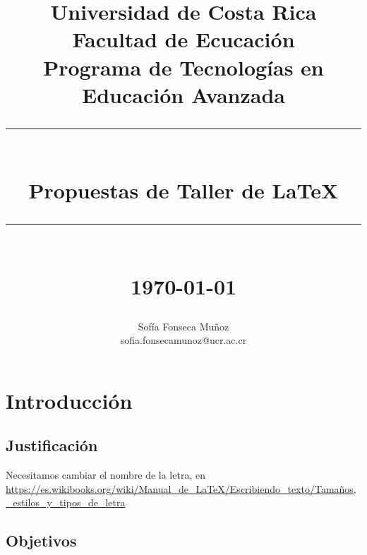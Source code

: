 \documentclass[12pt]{report}
\newcommand{\HRule}[1]{\rule{\linewidth}{#1}}
\begin{document}
\title{ \normalsize Universidad de Costa Rica \\
		Facultad de Ecucación\\
		Programa de Tecnologías en Educación Avanzada
		\\ [2.0cm]
		\HRule{0.5pt} \\
		\LARGE \textbf{Propuestas de Taller de \LaTeX} %
		\HRule{2pt} \\ [0.5cm]
		\normalsize \today \vspace*{5\baselineskip}}

\date{}

\author{
		Sofía Fonseca Muñoz \\ 
		 sofia.fonsecamunoz@ucr.ac.cr}
\maketitle

\tableofcontents
\newpage



\chapter{Introducción}

\section{Justificación}
Necesitamos cambiar el nombre de la letra, en \url{https://es.wikibooks.org/wiki/Manual_de_LaTeX/Escribiendo_texto/Tamaños,_estilos_y_tipos_de_letra}

\section{Objetivos}
\end{document}
